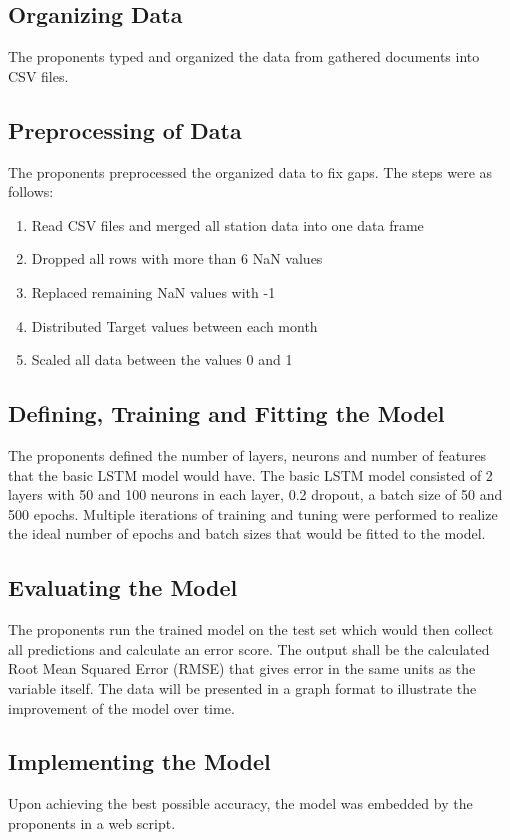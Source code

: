 \documentclass[10pt,11pt,12pt,oneside]{book}
\begin{document}
    \subsection{Organizing Data}
    The proponents typed and organized the data from gathered documents into CSV files.
    \subsection{Preprocessing of Data}
    The proponents preprocessed the organized data to fix gaps. The steps were as follows:
    \begin{enumerate}
        \item Read CSV files and merged all station data into one data frame
        \item Dropped all rows with more than 6 NaN values
        \item Replaced remaining NaN values with -1
        \item Distributed Target values between each month
        \item Scaled all data between the values 0 and 1
    \end{enumerate}
    \subsection{Defining, Training and Fitting the Model}
    The proponents defined the number of layers, neurons and number of features that the basic LSTM model would have. The basic LSTM model consisted of 2 layers with 50 and 100 neurons in each layer, 0.2 dropout, a batch size of 50 and 500 epochs. Multiple iterations of training and tuning were performed to realize the ideal number of epochs and batch sizes that would be fitted to the model.
    \subsection{Evaluating the Model}
    The proponents run the trained model on the test set which would then collect all predictions and calculate an error score. The output shall be the calculated Root Mean Squared Error (RMSE) that gives error in the same units as the variable itself. The data will be presented in a graph format to illustrate the improvement of the model over time.
    \subsection{Implementing the Model}
    Upon achieving the best possible accuracy, the model was embedded by the proponents in a web script.
    
\end{document}
